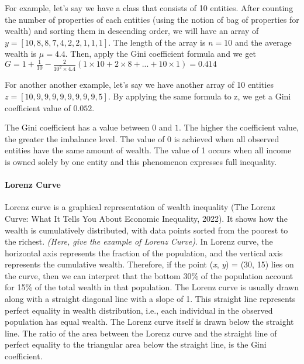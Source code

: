For example, let's say we have a class that consists of 10 entities. After counting the number of properties of each entities (using the notion of bag of properties for wealth) and sorting them in descending order, we will have an array of \(y = [10,8,8,7,4,2,2,1,1,1]\). The length of the array is \(n = 10\) and the average wealth is \(\mu = 4.4\). Then, apply the Gini coefficient formula and we get \(G = 1 + \frac{1}{10} - \frac{2}{10^{2}\times4.4}(1\times10 + 2\times8 + ... + 10\times1) = 0.414\)

For another another example, let's say we have another array of 10 entities \(z = [10, 9, 9, 9, 9, 9, 9, 9, 9, 5]\). By applying the same formula to z, we get a Gini coefficient value of \(0.052\).

The Gini coefficient has a value between \(0\) and \(1\). The higher the coefficient value, the greater the imbalance level. The value of 0 is achieved when all observed entities have the same amount of wealth. The value of 1 occurs when all income is owned solely by one entity and this phenomenon expresses full inequality.


\paragraph{Lorenz Curve} Lorenz curve is a graphical representation of wealth inequality (The Lorenz Curve: What It Tells You About Economic Inequality, 2022). It shows how the wealth is cumulatively distributed, with data points sorted from the poorest to the richest. \textit{(Here, give the example of Lorenz Curve)}. In Lorenz curve, the horizontal axis represents the fraction of the population, and the vertical axis represents the cumulative wealth. Therefore, if the point (\textit{x}, \textit{y}) = (30, 15) lies on the curve, then we can interpret that the bottom 30\% of the population account for 15\% of the total wealth in that population. The Lorenz curve is usually drawn along with a straight diagonal line with a slope of 1. This straight line represents perfect equality in wealth distribution, i.e., each individual in the observed population has equal wealth. The Lorenz curve itself is drawn below the straight line. The ratio of the area between the Lorenz curve and the straight line of perfect equality to the triangular area below the straight line, is the Gini coefficient.
